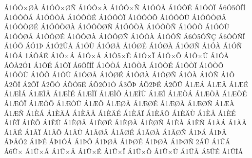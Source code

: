 {^^c11^^d3^^d4^^d7^^d8^^c0
^^c11^^d3^^d4^^d7^^d8^^d1
^^c11^^d3^^d4^^d7^^c0
^^c11^^d3^^d4^^d7^^d1
^^c11^^d3^^d4^^c5
^^c11^^d3^^d4^^c9
^^c11^^d3^^d4^^cf
^^c16^^d35^^d4^^cf^^cd
^^c11^^d3^^d4^^d2^^c1
^^c11^^d3^^d4^^d2^^c5
^^c11^^d3^^d4^^d2^^c9
^^c11^^d3^^d4^^d2^^cf
^^c11^^d3^^d4^^d2^^d5
^^c11^^d3^^d4^^d2^^d9
^^c11^^d3^^d4^^d2^^d8^^c5
^^c11^^d3^^d4^^d2^^d8^^c9
^^c11^^d3^^d4^^d2^^d8^^c0
^^c11^^d3^^d4^^d2^^d8^^d1
^^c11^^d3^^d4^^d2^^c0
^^c11^^d3^^d4^^d2^^d1
^^c11^^d3^^d4^^d5
^^c11^^d3^^d4^^d9
^^c11^^d3^^d4^^d8^^c5
^^c11^^d3^^d4^^d8^^c9
^^c11^^d3^^d4^^d8^^c0
^^c11^^d3^^d4^^d8^^d1
^^c11^^d3^^d4^^c0
^^c11^^d3^^d4^^d1
^^c16^^d35^^d4^^d1^^c7
^^c16^^d3^^d4^^d1^^ce
^^c11^^d3^^d5
^^c1^^d31^^de
^^c11^^d32^^db^^c5
^^c11^^d3^^d9
^^c11^^d3^^d8^^c5
^^c11^^d3^^d8^^c9
^^c11^^d3^^d8^^c0
^^c11^^d3^^d8^^d1
^^c11^^d3^^c0
^^c11^^d3^^d1
^^c11^^d4^^c1
1^^c1^^d4^^c1^^cb
^^c11^^d4^^d7^^c1
^^c11^^d4^^d7^^c5
^^c11^^d45^^d7^^c9
^^c11^^d4^^d7^^cf
^^c11^^d4^^d7^^d5
^^c11^^d4^^d7^^d9
^^c11^^d4^^c5
^^c1^^d4^^c52^^d31
^^c11^^d4^^c9
^^c11^^d4^^cf
^^c16^^d4^^cf^^cd^^ce
^^c11^^d4^^d2^^c1
^^c11^^d4^^d2^^c5
^^c11^^d4^^d2^^c9
^^c11^^d4^^d2^^cf
^^c11^^d4^^d2^^d5
^^c11^^d4^^d2^^d9
^^c11^^d4^^d5
^^c11^^d4^^d9
^^c11^^d4^^d8^^c5
^^c11^^d4^^d8^^c9
^^c11^^d4^^d8^^c0
^^c11^^d4^^d8^^d1
^^c11^^d4^^c0
^^c11^^d4^^d1
^^c11^^d5
^^c12^^d5^^cd
^^c12^^d5^^ce
^^c12^^d5^^d3
^^c1^^d5^^d35^^cb
^^c1^^d52^^d41^^d2
^^c13^^d5^^de
^^c1^^d52^^de^^c9
^^c12^^d5^^dc
^^c11^^c6^^c1
^^c11^^c6^^c5
^^c11^^c6^^c9
^^c11^^c6^^cc^^c1
^^c11^^c6^^cc^^c5
^^c11^^c6^^cc^^c9
^^c11^^c6^^cc^^cf
^^c11^^c6^^cc^^d5
^^c11^^c6^^cc^^d9
^^c11^^c6^^cf
^^c11^^c6^^d2^^c1
^^c11^^c6^^d2^^c5
^^c11^^c6^^d2^^c9
^^c11^^c6^^d2^^cf
^^c11^^c6^^d2^^d5
^^c11^^c6^^d2^^d9
^^c11^^c6^^d5
^^c11^^c6^^d8^^c5
^^c11^^c6^^d8^^c9
^^c11^^c6^^d8^^c0
^^c11^^c6^^d8^^d1
^^c11^^c6^^c0
^^c11^^c6^^d1
^^c11^^c8^^c1
^^c11^^c8^^c4^^c1
^^c11^^c8^^c4^^c5
^^c11^^c8^^c4^^c9
^^c11^^c8^^c4^^cf
^^c11^^c8^^c4^^d5
^^c11^^c8^^c4^^d9
^^c11^^c8^^c5
^^c11^^c8^^c9
^^c11^^c8^^cf
^^c11^^c8^^d5
^^c11^^c8^^d9
^^c11^^c8^^d8^^c5
^^c11^^c8^^d8^^c9
^^c11^^c8^^d8^^c0
^^c11^^c8^^d8^^d1
^^c11^^c8^^c0
^^c11^^c8^^d1
^^c11^^c3^^c1
^^c11^^c3^^c5
^^c11^^c3^^c9
^^c11^^c3^^cf
^^c11^^c3^^d5
^^c11^^c3^^d9
^^c11^^c3^^d8^^c5
^^c11^^c3^^d8^^c9
^^c11^^c3^^d8^^c0
^^c11^^c3^^d8^^d1
^^c11^^de^^c1
^^c11^^de^^c5
^^c1^^de^^c5^^d32
^^c11^^de^^c9
^^c1^^de1^^d4^^c1
^^c11^^de^^d5
^^c11^^de^^d8^^c5
^^c11^^de^^d8^^c9
^^c11^^de^^d8^^c0
^^c11^^de^^d8^^d1
2^^c1^^db
^^c11^^db^^c1
^^c16^^db^^d7
^^c11^^db^^d7^^c1
^^c11^^db^^d7^^c5
^^c11^^db^^d7^^c9
^^c11^^db^^d7^^cf
^^c11^^db^^d7^^d5
^^c11^^db^^d7^^d9
^^c11^^db^^c5
^^c15^^db^^c9
^^c11^^db^^cc^^c1
}
